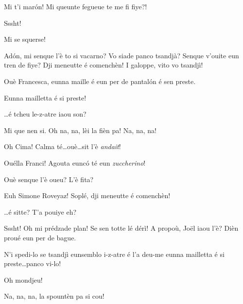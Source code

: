 \begin{drama}
\Marcospeaks{} Mi t'i mar\'on! Mi queunte fegueue te me fi fiye?!

\Pierrespeaks Sssht!

\Joelspeaks Mi se squerse!


\Francescaspeaks Ad\'on, mi senque l'è to si vacarno? Vo siade panco tsandjà? Senque v'ouite eun tren de fiye? Dji meneutte é comenchèn! I galoppe, vito vo tsandjì!

\Marcospeaks Ouè Francesca, eunna maille é eun per de pantal\'on é sen preste.

\Joelspeaks Eunna mailletta é si preste!


\Francescaspeaks \ldots é tcheu le-z-atre iaou son?

\Cimaspeaks Mi que nen si. Oh na, na, lèi la fièn pa! Na, na, na!

\Francescaspeaks Oh Cima! Calma té\ldots ouè\ldots sit l'è \textit{andait}! 


\Simonespeaks{} Ouélla Franci! Agouta euncó té eun \textit{zuccherino}!


\Cimaspeaks{} Ouè senque l'è oueu? L'è fita?

\Francescaspeaks Euh Simone Roveyaz! Soplé, dji meneutte é comenchèn!

\Simonespeaks{} \ldots é sitte? T'a pouiye eh?



\Joellespeaks Sssht! Oh mi prédzade plan! Se sen totte lé dérì!   A propoù, Jo\"{e}l iaou l'è? Dièn proué eun per de bague.

\Francescaspeaks N'i spedi-lo se tsandjì eunsemblo i-z-atre é l'a deu-me \og eunna mailletta é si preste\fg \ldots panco vi-lo!

\Joellespeaks Oh mondjeu!

\Cimaspeaks{} Na, na, na, la spountèn pa si cou!


\end{drama}
